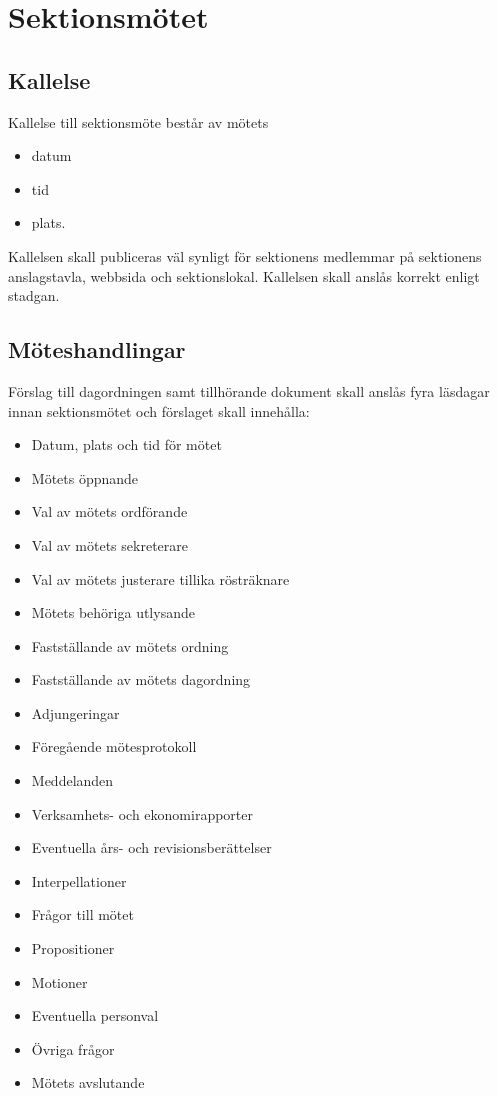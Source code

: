 \section{Sektionsmötet}

\subsection{Kallelse}
Kallelse till sektionsmöte består av mötets
\begin{itemize}
    \item datum
    \item tid
    \item plats.
\end{itemize}

Kallelsen skall publiceras väl synligt för sektionens medlemmar på sektionens anslagstavla, webbsida och sektionslokal. Kallelsen skall anslås korrekt enligt stadgan. 

\subsection{Möteshandlingar}
Förslag till dagordningen samt tillhörande dokument skall anslås fyra läsdagar innan sektionsmötet och förslaget skall innehålla:

\begin{itemize}
	\item Datum, plats och tid för mötet
	\item Mötets öppnande
	\item Val av mötets ordförande
	\item Val av mötets sekreterare
	\item Val av mötets justerare tillika rösträknare
	\item Mötets behöriga utlysande
    \item Fastställande av mötets ordning
	\item Fastställande av mötets dagordning
	\item Adjungeringar
	\item Föregående mötesprotokoll
	\item Meddelanden
	\item Verksamhets- och ekonomirapporter
	\item Eventuella års- och revisionsberättelser
	\item Interpellationer
    \item Frågor till mötet
    \item Propositioner
	\item Motioner
	\item Eventuella personval
	\item Övriga frågor
	\item Mötets avslutande
\end{itemize}

